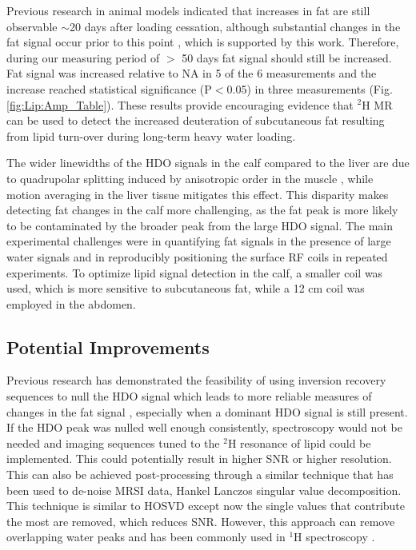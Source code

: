 Previous research in animal models indicated that increases in fat are still observable $\sim$20 days after loading cessation, although substantial changes in the fat signal occur prior to this point \cite{Brereton1986PreliminarySpectroscopy}, which is supported by this work. Therefore, during our measuring period of $>$ 50 days fat signal should still be increased. Fat signal was increased relative to \ac{NA} in 5 of the 6 measurements and the increase reached statistical significance (P$<$0.05) in three measurements (Fig. \ref{fig:Lip:Amp_Table}). These results provide encouraging evidence that $^2$H MR can be used to detect the increased deuteration of subcutaneous fat resulting from lipid turn-over during long-term heavy water loading. 

The wider linewidths of the \ac{HDO} signals in the calf compared to the liver are due to quadrupolar splitting induced by anisotropic order in the muscle \cite{Gursan2022ResidualMuscle}, while motion averaging in the liver tissue mitigates this effect. This disparity makes detecting fat changes in the calf more challenging, as the fat peak is more likely to be contaminated by the broader peak from the large \ac{HDO} signal. The main experimental challenges were in quantifying fat signals in the presence of large water signals and in reproducibly positioning the surface RF coils in repeated experiments. To optimize lipid signal detection in the calf, a smaller coil was used, which is more sensitive to subcutaneous fat, while a 12 cm coil was employed in the abdomen. 

\subsection{Potential Improvements}

Previous research has demonstrated the feasibility of using inversion recovery sequences to null the HDO signal which leads to more reliable measures of changes in the fat signal \cite{Brereton1989TheMice}, especially when a dominant \ac{HDO} signal is still present. If the \ac{HDO} peak was nulled well enough consistently, spectroscopy would not be needed and imaging sequences tuned to the $^2$H resonance of lipid could be implemented. This could potentially result in higher \ac{SNR} or higher resolution. This can also be achieved post-processing through a similar technique that has been used to de-noise \ac{MRSI} data, Hankel Lanczos singular value decomposition. This technique is similar to \ac{HOSVD} except now the single values that contribute the most are removed, which reduces SNR. However, this approach can remove overlapping water peaks and has been commonly used in $^1$H spectroscopy \cite{Jansen20061HMetabolites, Cabanes2001OptimizationBrain}.

